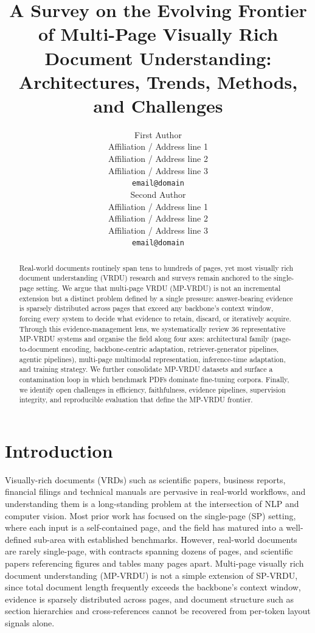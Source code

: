 \documentclass[11pt]{article}
\title{A Survey on the Evolving Frontier of Multi-Page Visually Rich Document Understanding: Architectures, Trends, Methods, and Challenges}
\author{First Author \\
  Affiliation / Address line 1 \\
  Affiliation / Address line 2 \\
  Affiliation / Address line 3 \\
  \texttt{email@domain} \\\And
  Second Author \\
  Affiliation / Address line 1 \\
  Affiliation / Address line 2 \\
  Affiliation / Address line 3 \\
  \texttt{email@domain} \\}
\begin{document}
\maketitle
\begin{abstract}
Real-world documents routinely span tens to hundreds of pages, yet most visually rich document understanding (VRDU) research and surveys remain anchored to the single-page setting. We argue that multi-page VRDU (MP-VRDU) is not an incremental extension but a distinct problem defined by a single pressure: answer-bearing evidence is sparsely distributed across pages that exceed any backbone's context window, forcing every system to decide what evidence to retain, discard, or iteratively acquire. Through this evidence-management lens, we systematically review 36 representative MP-VRDU systems and organise the field along four axes: architectural family (page-to-document encoding, backbone-centric adaptation, retriever-generator pipelines, agentic pipelines), multi-page multimodal representation, inference-time adaptation, and training strategy. We further consolidate MP-VRDU datasets and surface a contamination loop in which benchmark PDFs dominate fine-tuning corpora. Finally, we identify open challenges in efficiency, faithfulness, evidence pipelines, supervision integrity, and reproducible evaluation that define the MP-VRDU frontier.

\end{abstract}

\section{Introduction}
Visually-rich documents (VRDs) such as scientific papers, business reports, financial filings and technical manuals are pervasive in real-world workflows, and understanding them is a long-standing problem at the intersection of NLP and computer vision. Most prior work has focused on the single-page (SP) setting, where each input is a self-contained page, and the field has matured into a well-defined sub-area with established benchmarks. However, real-world documents are rarely single-page, with contracts spanning dozens of pages, and scientific papers referencing figures and tables many pages apart. Multi-page visually rich document understanding (MP-VRDU) is not a simple extension of SP-VRDU, since total document length frequently exceeds the backbone's context window, evidence is sparsely distributed across pages, and document structure such as section hierarchies and cross-references cannot be recovered from per-token layout signals alone.
\end{document}
